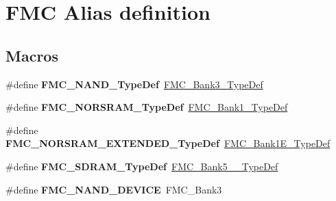 \hypertarget{group___f_m_c___l_l___alias__definition}{}\section{F\+MC Alias definition}
\label{group___f_m_c___l_l___alias__definition}
\subsection*{Macros}
\begin{DoxyCompactItemize}
\item 
\#define {\bfseries F\+M\+C\+\_\+\+N\+A\+N\+D\+\_\+\+Type\+Def}~\hyperlink{struct_f_m_c___bank3___type_def}{F\+M\+C\+\_\+\+Bank3\+\_\+\+Type\+Def}\hypertarget{group___f_m_c___l_l___alias__definition_ga6d8a647bc5306f6eed892982ffc88158}{}\label{group___f_m_c___l_l___alias__definition_ga6d8a647bc5306f6eed892982ffc88158}

\item 
\#define {\bfseries F\+M\+C\+\_\+\+N\+O\+R\+S\+R\+A\+M\+\_\+\+Type\+Def}~\hyperlink{struct_f_m_c___bank1___type_def}{F\+M\+C\+\_\+\+Bank1\+\_\+\+Type\+Def}\hypertarget{group___f_m_c___l_l___alias__definition_ga3c2be18a99209a78da8e80b28cf2f5b7}{}\label{group___f_m_c___l_l___alias__definition_ga3c2be18a99209a78da8e80b28cf2f5b7}

\item 
\#define {\bfseries F\+M\+C\+\_\+\+N\+O\+R\+S\+R\+A\+M\+\_\+\+E\+X\+T\+E\+N\+D\+E\+D\+\_\+\+Type\+Def}~\hyperlink{struct_f_m_c___bank1_e___type_def}{F\+M\+C\+\_\+\+Bank1\+E\+\_\+\+Type\+Def}\hypertarget{group___f_m_c___l_l___alias__definition_ga622edd64de89d4a45a09947818be1082}{}\label{group___f_m_c___l_l___alias__definition_ga622edd64de89d4a45a09947818be1082}

\item 
\#define {\bfseries F\+M\+C\+\_\+\+S\+D\+R\+A\+M\+\_\+\+Type\+Def}~\hyperlink{struct_f_m_c___bank5__6___type_def}{F\+M\+C\+\_\+\+Bank5\+\_\+\_\+\+Type\+Def}\hypertarget{group___f_m_c___l_l___alias__definition_gaba1c548ce7fd2d0d4da284ad845ab6f5}{}\label{group___f_m_c___l_l___alias__definition_gaba1c548ce7fd2d0d4da284ad845ab6f5}

\item 
\#define {\bfseries F\+M\+C\+\_\+\+N\+A\+N\+D\+\_\+\+D\+E\+V\+I\+CE}~F\+M\+C\+\_\+\+Bank3\hypertarget{group___f_m_c___l_l___alias__definition_ga5cff4bb2c897afc003cc45726e1e959f}{}\label{group___f_m_c___l_l___alias__definition_ga5cff4bb2c897afc003cc45726e1e959f}


\end{DoxyCompactItemize}
